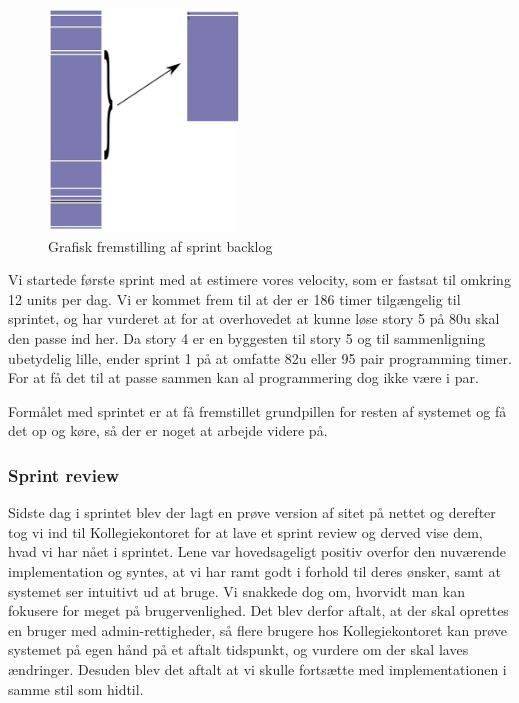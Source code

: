 \documentclass[12pt, a4paper]{report}
\begin{document}
\begin{figure}
\begin{center}
\includegraphics[width=0.45\textwidth]{sprint1log}
\end{center}
\caption{Grafisk fremstilling af sprint backlog}
\label{sprintlog1}
\end{figure}

Vi startede første sprint med at estimere vores velocity, som er fastsat til omkring 12 units per dag. Vi er kommet frem til at der er 186 timer tilgængelig til sprintet, og har vurderet at for at overhovedet at kunne løse story 5 på 80u skal den passe ind her. Da story 4 er en byggesten til story 5 og til sammenligning ubetydelig lille, ender sprint 1 på at omfatte 82u eller 95 pair programming timer. For at få det til at passe sammen kan al programmering dog ikke være i par.

Formålet med sprintet er at få fremstillet grundpillen for resten af systemet og få det op og køre, så der er noget at arbejde videre på.


\subsubsection{Sprint review}

Sidste dag i sprintet blev der lagt en prøve version af sitet på nettet og derefter tog vi ind til Kollegiekontoret for at lave et sprint review og derved vise dem, hvad vi har nået i sprintet. Lene var hovedsageligt positiv overfor den nuværende implementation og syntes, at vi har ramt godt i forhold til deres ønsker, samt at systemet ser intuitivt ud at bruge. Vi snakkede dog om, hvorvidt man kan fokusere for meget på brugervenlighed. Det blev derfor aftalt, at der skal oprettes en bruger med admin-rettigheder, så flere brugere hos Kollegiekontoret kan prøve systemet på egen hånd på et aftalt tidspunkt, og vurdere om der skal laves ændringer. Desuden blev det aftalt at vi skulle fortsætte med implementationen i samme stil som hidtil.
\end{document}
